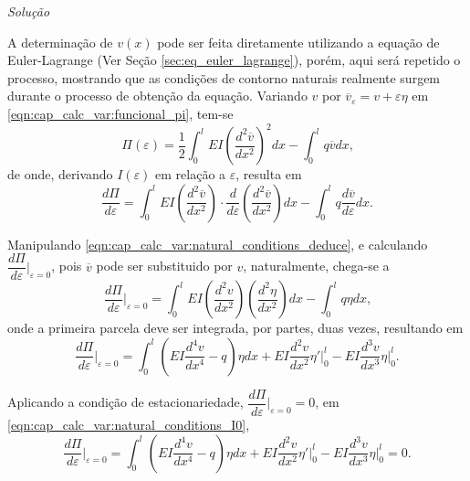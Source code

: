 \documentclass[
	12pt,				%
	openright,			%
    twoside,			%
	a4paper,			%
	chapter=TITLE,		%
	english,			%
	french,				%
	spanish,			%
	brazil				%
	]{abntex2}
\makeatletter
\renewenvironment{proof}[1][\proofname]{
	\par\pushQED{\qed}%
	\normalfont \topsep6\p@\@plus6\p@\relax
	\trivlist
	\item\relax
		{\itshape
			#1\@addpunct{.}}\hspace\labelsep\ignorespaces
}{%
	\popQED\endtrivlist\@endpefalse
}
\newenvironment{solution}{
	\begin{proof}[Solução]
}{%
	\end{proof}
}
\numberwithin{lema}{chapter}
\numberwithin{teorema}{chapter}
\numberwithin{definicao}{chapter}
\numberwithin{exemplo}{chapter}
\numberwithin{figure}{chapter}
\makeatother
\begin{document}
\begin{solution}
	A determinação de $v(x)$ pode ser feita diretamente utilizando a equação de Euler-Lagrange (Ver Seção \ref{sec:eq_euler_lagrange}), porém, aqui será repetido o processo, mostrando que as condições de contorno naturais realmente surgem durante o processo de obtenção da equação. Variando $v$ por $\overline{v}_{\varepsilon}=v+\varepsilon \eta$ em \eqref{eqn:cap_calc_var:funcional_pi}, tem-se
	$$
		\Pi(\varepsilon) = \frac{1}{2} \int_{0}^{l}
			EI \left (
				\frac{d^2\overline{v}}{dx^2}
			\right )^2 dx
			-
			\int_{0}^{l} q\overline{v} dx
			\text{,}
	$$
	de onde, derivando $I(\varepsilon)$ em relação a $\varepsilon$, resulta em
	\begin{equation}
		\label{eqn:cap_calc_var:natural_conditions_deduce}
		\frac{d\Pi}{d\varepsilon} = 
			\int_{0}^{l} EI \left (
				\frac{d^2\overline{v}}{dx^2}
			\right ) \cdot 
			\frac{d}{d\varepsilon}\left (
				\frac{d^2\overline{v}}{dx^2}
			\right ) dx
			-
			\int_{0}^{l} q\frac{d\overline{v}}{d\varepsilon} dx
			\text{.}
	\end{equation}
	
	Manipulando \eqref{eqn:cap_calc_var:natural_conditions_deduce}, e calculando $\dfrac{d\Pi}{d\varepsilon}\Big |_{\varepsilon=0}$, pois $\overline{v}$ pode ser substituido por $v$, naturalmente, chega-se a
	$$
		\frac{d\Pi}{d\varepsilon}\Big |_{\varepsilon=0} = 
			\int_{0}^{l} EI \left (
				\frac{d^2v}{dx^2}
			\right ) \left (
				\frac{d^2\eta}{dx^2}
			\right ) dx
			-
			\int_{0}^{l}q\eta dx
		\text{,}
	$$
	onde a primeira parcela deve ser integrada, por partes, duas vezes, resultando em
	\begin{equation}
		\label{eqn:cap_calc_var:natural_conditions_I0}
		\frac{d\Pi}{d\varepsilon}\Big |_{\varepsilon=0} = 
			\int_{0}^{l} \left (
				EI\frac{d^4 v}{dx^4}-q 
			\right ) \eta dx
			+
			EI\frac{d^2 v}{dx^2} \eta' \Big |_{0}^{l}
			-
			EI\frac{d^3 v}{dx^3} \eta \Big |_{0}^{l}
			\text{.}
	\end{equation}
	
	Aplicando a condição de estacionariedade, $\dfrac{d\Pi}{d\varepsilon}\Big |_{\varepsilon=0}=0$, em \eqref{eqn:cap_calc_var:natural_conditions_I0},
	\begin{equation}
		\label{eqn:cap_calc_var:natural_conditions_I0_eq_0}
		\frac{d\Pi}{d\varepsilon}\Big |_{\varepsilon=0} = 
			\int_{0}^{l} \left (
				EI\frac{d^4 v}{dx^4}-q 
			\right ) \eta dx
			+
			EI\frac{d^2 v}{dx^2} \eta ' \Big |_{0}^{l}
			-
			EI\frac{d^3 v}{dx^3} \eta \Big |_{0}^{l}
			= 0
			\text{.}
	\end{equation}


\end{solution}
\end{document}
